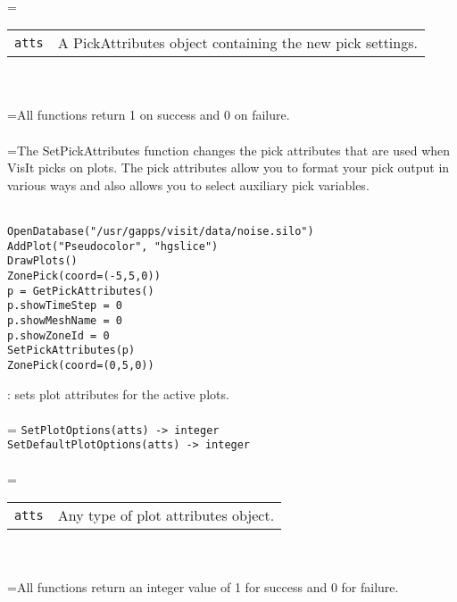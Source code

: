 \documentclass[10pt,a4paper]{report}
\begin{document}
 \\ 
\hangindent=\parindent 
\begin{tabular}{lp{9cm}}
\verb!atts! & A PickAttributes object containing the new pick settings. \\
\end{tabular} \\[-2mm]


 \\ 
\hangindent=\parindent All functions return 1 on success and 0 on failure. \\[-3mm] 

 \\ 
\hangindent=\parindent The SetPickAttributes function changes the pick attributes that are used when VisIt picks on plots. The pick attributes allow you to format your pick output in various ways and also allows you to select auxiliary pick variables. \\[-3mm] 

\\[-6mm]
\begin{verbatim}OpenDatabase("/usr/gapps/visit/data/noise.silo")
AddPlot("Pseudocolor", "hgslice")
DrawPlots()
ZonePick(coord=(-5,5,0))
p = GetPickAttributes()
p.showTimeStep = 0
p.showMeshName = 0
p.showZoneId = 0
SetPickAttributes(p)
ZonePick(coord=(0,5,0))
\end{verbatim}
\newpage


{}
: sets plot attributes for the active plots.\\[-3mm]

 \\ 
\hangindent=\parindent 
\verb!SetPlotOptions(atts) -> integer!\\ 
\verb!SetDefaultPlotOptions(atts) -> integer!\\ [-3mm]

 \\ 
\hangindent=\parindent 
\begin{tabular}{ll}
\verb!atts! & Any type of plot attributes object. \\
\end{tabular} \\[-2mm]


 \\ 
\hangindent=\parindent All functions return an integer value of 1 for success and 0 for failure. \\[-3mm] 
\end{document}
